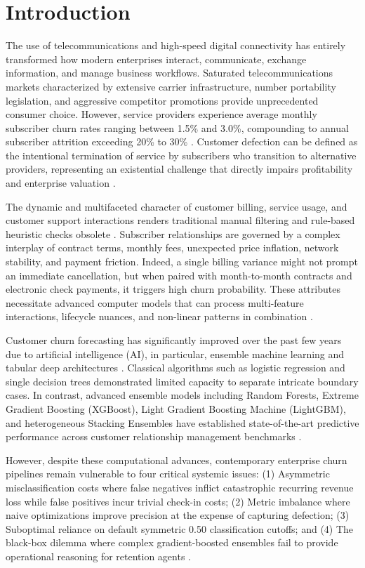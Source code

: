 \documentclass[conference]{IEEEtran}
\begin{document}
\section{Introduction}
The use of telecommunications and high-speed digital connectivity has entirely transformed how modern enterprises interact, communicate, exchange information, and manage business workflows. Saturated telecommunications markets characterized by extensive carrier infrastructure, number portability legislation, and aggressive competitor promotions provide unprecedented consumer choice. However, service providers experience average monthly subscriber churn rates ranging between 1.5\% and 3.0\%, compounding to annual subscriber attrition exceeding 20\% to 30\% \cite{ref1}. Customer defection can be defined as the intentional termination of service by subscribers who transition to alternative providers, representing an existential challenge that directly impairs profitability and enterprise valuation \cite{ref2}.

The dynamic and multifaceted character of customer billing, service usage, and customer support interactions renders traditional manual filtering and rule-based heuristic checks obsolete \cite{ref3}. Subscriber relationships are governed by a complex interplay of contract terms, monthly fees, unexpected price inflation, network stability, and payment friction. Indeed, a single billing variance might not prompt an immediate cancellation, but when paired with month-to-month contracts and electronic check payments, it triggers high churn probability. These attributes necessitate advanced computer models that can process multi-feature interactions, lifecycle nuances, and non-linear patterns in combination \cite{ref4}.

Customer churn forecasting has significantly improved over the past few years due to artificial intelligence (AI), in particular, ensemble machine learning and tabular deep architectures \cite{ref5}. Classical algorithms such as logistic regression and single decision trees demonstrated limited capacity to separate intricate boundary cases. In contrast, advanced ensemble models including Random Forests, Extreme Gradient Boosting (XGBoost), Light Gradient Boosting Machine (LightGBM), and heterogeneous Stacking Ensembles have established state-of-the-art predictive performance across customer relationship management benchmarks \cite{ref6}.

However, despite these computational advances, contemporary enterprise churn pipelines remain vulnerable to four critical systemic issues: (1) Asymmetric misclassification costs where false negatives inflict catastrophic recurring revenue loss while false positives incur trivial check-in costs; (2) Metric imbalance where naive optimizations improve precision at the expense of capturing defection; (3) Suboptimal reliance on default symmetric 0.50 classification cutoffs; and (4) The black-box dilemma where complex gradient-boosted ensembles fail to provide operational reasoning for retention agents \cite{ref7}.
\end{document}
